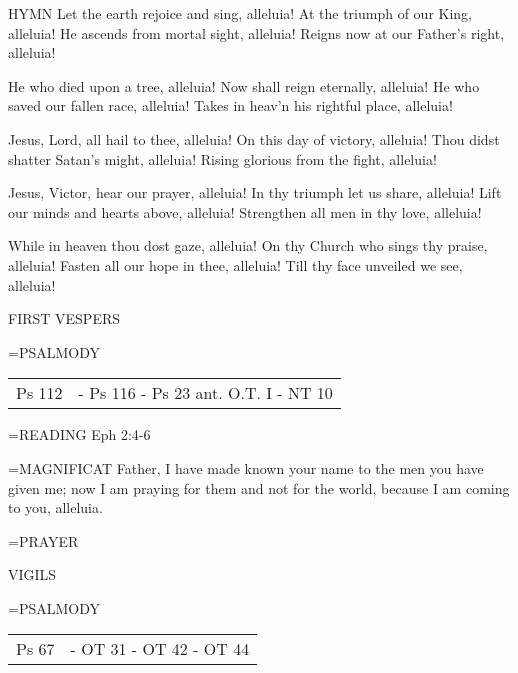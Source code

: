 HYMN
Let the earth rejoice and sing, alleluia!
At the triumph of our King, alleluia!
He ascends from mortal sight, alleluia!
Reigns now at our Father's right, alleluia!

He who died upon a tree, alleluia!
Now shall reign eternally, alleluia!
He who saved our fallen race, alleluia!
Takes in heav'n his rightful place, alleluia!

Jesus, Lord, all hail to thee, alleluia!
On this day of victory, alleluia!
Thou didst shatter Satan's might, alleluia!
Rising glorious from the fight, alleluia!

Jesus, Victor, hear our prayer, alleluia!
In thy triumph let us share, alleluia!
Lift our minds and hearts above, alleluia!
Strengthen all men in thy love, alleluia!

While in heaven thou dost gaze, alleluia!
On thy Church who sings thy praise, alleluia!
Fasten all our hope in thee, alleluia!
Till thy face unveiled we see, alleluia!

\begin{flushleft}\normalsize FIRST VESPERS\\\end{flushleft}
\hangindent=\parindent \small{PSALMODY}
\begin{center}
\begin{tabular}{ l l }
Ps 112 &  - Ps 116 - Ps 23 ant. O.T. I - NT 10\\
\end{tabular}
\end{center}		

\hangindent=\parindent \small{READING}    Eph 2:4-6 \textbf{   \\}

\hangindent=\parindent \small{MAGNIFICAT 	Father, I have made known your name to the men you have given me; now I am praying for them and not for the world, because I am coming to you, alleluia.\\}

\hangindent=\parindent \small{PRAYER 	}

\begin{flushleft}\normalsize VIGILS\\\end{flushleft}
\hangindent=\parindent \small{PSALMODY}
\begin{center}
\begin{tabular}{ l l }
Ps 67 &  - OT 31 - OT 42 - OT 44\\
\end{tabular}
\end{center}		

